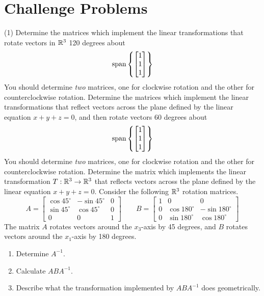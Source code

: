 \section{Challenge Problems}

\begin{tasks}[resume, style=enumerate](1)
\task
  Determine the matrices which implement the linear transformations
  that rotate vectors in $\mathbb R^3$ 120 degrees about
  \begin{align*}
    \operatorname{\mathrm{span}}\left\{\begin{bmatrix}1 \\ 1 \\ 1\end{bmatrix}\right\}
  \end{align*}
  You should determine \textit{two} matrices, one for clockwise
  rotation and the other for counterclockwise rotation.
\task
  Determine the matrices which implement the linear transformations
  that reflect vectors across the plane defined by the linear
  equation $x + y + z = 0$, and then rotate vectors 60 degrees about
  \begin{align*}
    \operatorname{\mathrm{span}}\left\{\begin{bmatrix}1 \\ 1 \\ 1\end{bmatrix}\right\}
  \end{align*}
  You should determine \textit{two} matrices, one for clockwise
  rotation and the other for counterclockwise rotation.
\task
  Determine the matrix which implements the linear transformation $T :
  \mathbb R^3 \to \mathbb R^3$ that reflects vectors across the plane defined by the
  linear equation $x + y + z = 0$.
\task
  Consider the following $\mathbb R^3$ rotation matrices.
  \begin{displaymath}
    A =
    \begin{bmatrix}
      \cos 45^\circ & -\sin 45^\circ & 0 \\
      \sin 45^\circ & \cos 45^\circ & 0 \\
      0 & 0 & 1
    \end{bmatrix}
    \qquad
    B =
    \begin{bmatrix}
      1 & 0 & 0 \\
      0 & \cos 180^\circ & -\sin 180^\circ \\
      0 & \sin 180^\circ & \cos 180^\circ
    \end{bmatrix}
  \end{displaymath}
  The matrix $A$ rotates vectors around the $x_3$-axis by 45 degrees,
  and $B$ rotates vectors around the $x_1$-axis by 180 degrees.
  \begin{enumerate}[label=(\alph*)]
  \item
    Determine $A^{-1}$.
  \item
    Calculate $ABA^{-1}$.
  \item
    Describe what the transformation implemented by $ABA^{-1}$ does
    geometrically.
  \end{enumerate}
\end{tasks}
